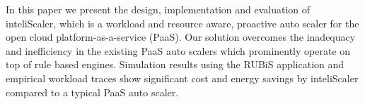 In this paper we present the design, implementation and evaluation of inteliScaler, which is a workload and resource aware, proactive auto scaler for the open cloud platform-as-a-service (PaaS). Our solution overcomes the inadequacy and inefficiency in the existing PaaS auto scalers which prominently operate on top of rule based engines. Simulation results using the RUBiS application and empirical workload traces show significant cost and energy savings by inteliScaler compared to a typical PaaS auto scaler.